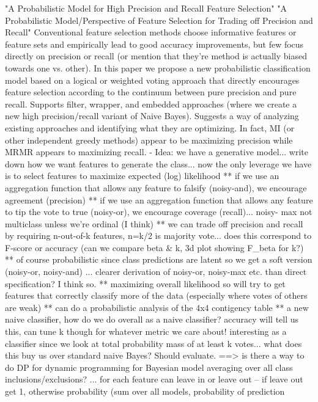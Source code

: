 "A Probabilistic Model for High Precision and Recall Feature Selection"
"A Probabilistic Model/Perspective of Feature Selection for Trading off Precision and Recall"
Conventional feature selection methods choose informative features or feature sets and empirically lead to good accuracy improvements, but 
few focus directly on precision or recall (or mention that they're method is actually biased towards one vs. other).  In this paper we 
propose a new probabilistic classification model based on a logical or weighted voting approach that directly encourages feature selection 
according to the continuum between pure precision and pure recall.  Supports filter, wrapper, and embedded approaches (where we create a 
new high precision/recall variant of Naive Bayes).  Suggests a way of analyzing existing approaches and identifying what they are 
optimizing.  In fact, MI (or other independent greedy methods) appear to be maximizing precision while MRMR appears to maximizing recall.
- Idea: we have a generative model... write down how we want features to generate the class... now the only leverage we have is to select 
features to maximize expected (log) likelihood
** if we use an aggregation function that allows any feature to falsify (noisy-and), we encourage agreement (precision)
** if we use an aggregation function that allows any feature to tip the vote to true (noisy-or), we encourage coverage (recall)... noisy-
max not multiclass unless we're ordinal (I think)
** we can trade off precision and recall by requiring n-out-of-k features, n=k/2 is majority vote... does this correspond to F-score or 
accuracy (can we compare beta & k, 3d plot showing F_beta for k?)
** of course probabilistic since class predictions are latent so we get a soft version (noisy-or, noisy-and) ... clearer derivation of 
noisy-or, noisy-max etc. than direct specification?  I think so.
** maximizing overall likelihood so will try to get features that correctly classify more of the data (especially where votes of others are 
weak)
** can do a probabilistic analysis of the 4x4 contigency table
** a new naive classifier, how do we do overall as a naive classifier?  accuracy will tell us this, can tune k though for whatever metric 
we care about!  interesting as a classifier since we look at total probability mass of at least k votes... what does this buy us over 
standard naive Bayes?  Should evaluate.
==> is there a way to do DP for dynamic programming for Bayesian model averaging over all class inclusions/exclusions?
... for each feature can leave in or leave out -- if leave out get 1, otherwise probability (sum over all models, probability of prediction 
